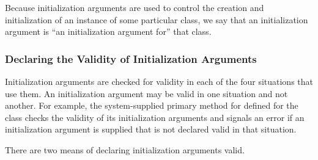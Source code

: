 Because initialization arguments are used to control the creation and
initialization of an instance of some particular class, we say that an
initialization argument is ``an initialization argument for'' that
class.

\subsubsection{Declaring the Validity of Initialization Arguments}
\label{Declaring-the-Validity-of-Initialization-Arguments-SECTION}

Initialization arguments are checked for validity in each of the four
situations that use them.  An initialization argument may be valid in
one situation and not another. For example, the system-supplied
primary method for  defined for the class 
 checks the validity of its initialization arguments
and signals an error if an initialization argument is supplied that is
not declared valid in that situation.

There are two means of declaring initialization arguments valid.

